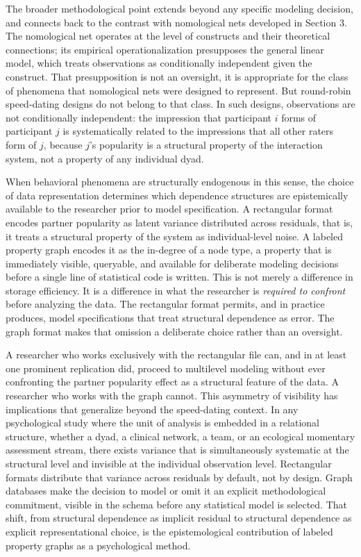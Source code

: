 \documentclass[sn-apa,pdflatex]{sn-jnl}
\theoremstyle{remark}
\theoremstyle{definition}
\begin{document}
The broader methodological point extends beyond any specific modeling
decision, and connects back to the contrast with nomological nets
developed in Section 3. The nomological net operates at the level of
constructs and their theoretical connections; its empirical
operationalization presupposes the general linear model, which treats
observations as conditionally independent given the construct. That
presupposition is not an oversight, it is appropriate for the class of
phenomena that nomological nets were designed to represent. But
round-robin speed-dating designs do not belong to that class. In such
designs, observations are not conditionally independent: the impression
that participant \(i\) forms of participant \(j\) is systematically
related to the impressions that all other raters form of \(j\), because
\(j\)'s popularity is a structural property of the interaction system,
not a property of any individual dyad.

When behavioral phenomena are structurally endogenous in this sense, the
choice of data representation determines which dependence structures are
epistemically available to the researcher prior to model specification.
A rectangular format encodes partner popularity as latent variance
distributed across residuals, that is, it treats a structural property
of the system as individual-level noise. A labeled property graph
encodes it as the in-degree of a node type, a property that is
immediately visible, queryable, and available for deliberate modeling
decisions before a single line of statistical code is written. This is
not merely a difference in storage efficiency. It is a difference in
what the researcher is \emph{required to confront} before analyzing the
data. The rectangular format permits, and in practice produces, model
specifications that treat structural dependence as error. The graph
format makes that omission a deliberate choice rather than an oversight.

A researcher who works exclusively with the rectangular file can, and in
at least one prominent replication did, proceed to multilevel modeling
without ever confronting the partner popularity effect as a structural
feature of the data. A researcher who works with the graph cannot. This
asymmetry of visibility has implications that generalize beyond the
speed-dating context. In any psychological study where the unit of
analysis is embedded in a relational structure, whether a dyad, a
clinical network, a team, or an ecological momentary assessment stream,
there exists variance that is simultaneously systematic at the
structural level and invisible at the individual observation level.
Rectangular formats distribute that variance across residuals by
default, not by design. Graph databases make the decision to model or
omit it an explicit methodological commitment, visible in the schema
before any statistical model is selected. That shift, from structural
dependence as implicit residual to structural dependence as explicit
representational choice, is the epistemological contribution of labeled
property graphs as a psychological method.
\end{document}
